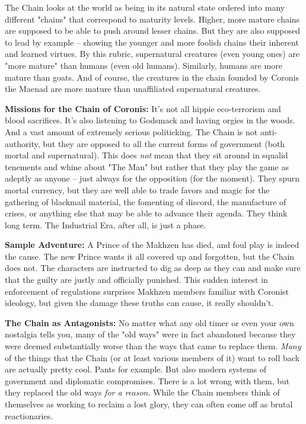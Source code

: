 The Chain looks at the world as being in its natural state ordered into many different "chains" that correspond to maturity levels. Higher, more mature chains are supposed to be able to push around lesser chains. But they are also supposed to lead by example -- showing the younger and more foolish chains their inherent and learned virtues. By this rubric, supernatural creatures (even young ones) are "more mature" than humans (even old humans). Similarly, humans are more mature than goats. And of course, the creatures in the chain founded by Coronis the Maenad are more mature than unaffiliated supernatural creatures.

\textbf{Missions for the Chain of Coronis:} It's not all hippie eco-terrorism and blood sacrifices. It's also listening to Godsmack and having orgies in the woods. And a vast amount of extremely serious politicking. The Chain is not anti-authority, but they are opposed to all the current forms of government (both mortal and supernatural). This does \textit{not} mean that they sit around in squalid tenements and whine about "The Man" but rather that they play the game as adeptly as anyone -- just always for the opposition (for the moment). They spurn mortal currency, but they are well able to trade favors and magic for the gathering of blackmail material, the fomenting of discord, the manufacture of crises, or anything else that may be able to advance their agenda. They think long term. The Industrial Era, after all, is just a phase.

\textbf{Sample Adventure:} A Prince of the Makhzen has died, and foul play is indeed the cause. The new Prince wants it all covered up and forgotten, but the Chain does not. The characters are instructed to dig as deep as they can and make sure that the guilty are justly and officially punished. This sudden interest in enforcement of regulations surprises Makhzen members familiar with Coronist ideology, but given the damage these truths can cause, it really shouldn't.

\textbf{The Chain as Antagonists:} No matter what any old timer or even your own nostalgia tells you, many of the "old ways" were in fact abandoned because they were deemed substantially worse than the ways that came to replace them. \textit{Many} of the things that the Chain (or at least various members of it) want to roll back are actually pretty cool. Pants for example. But also modern systems of government and diplomatic compromises. There is a lot wrong with them, but they replaced the old ways \textit{for a reason}. While the Chain members think of themselves as working to reclaim a lost glory, they can often come off as brutal reactionaries.

